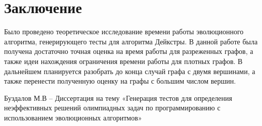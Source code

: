 \documentclass{spisok-article}
\begin{document}
\section{Заключение}

Было проведено теоретическое исследование времени работы эволюционного алгоритма, генерирующего тесты для алгоритма Дейкстры. В данной работе была получена достаточно точная оценка на время работы для разреженных графов, а также идеи нахождения ограничения времени работы для плотных графов. В дальнейшем планируется разобрать до конца случай графа с двумя вершинами, а также перенести полученную оценку на графы с большим числом вершин. 

\renewcommand\refname{Литература}
\begin{thebibliography}{8}

 Буздалов М.В -- Диссертация на тему «Генерация тестов для определения неэффективных решений олимпиадных задач по программированию с использованием эволюционных алгоритмов»

\end{thebibliography}
\end{document}
